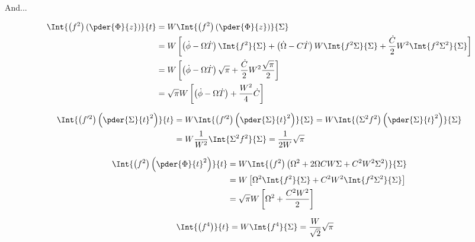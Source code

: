 And...

\begin{equation}
\begin{split}
\Int{\left(f^2\right)  \left(\pder{\Phi}{z}\right)}{t}  &= W \Int{\left(f^2\right)  \left(\pder{\Phi}{z}\right)}{\Sigma}\\
& = W\left[\left(\dot{\phi}- \Omega\dot{T}\right)\Int{f^2}{\Sigma} + \left(\dot{\Omega}- C\dot{T}\right)W \Int{ f^2 \Sigma}{\Sigma}  + \frac{\dot{C}}{2}W^2 \Int{ f^2 \Sigma^2}{\Sigma} \right]  \\
& = W\left[\left(\dot{\phi}- \Omega\dot{T}\right)\sqrt{\pi} + \frac{\dot{C}}{2}W^2 \frac{\sqrt{\pi}}{2} \right]  \\
& = \sqrt{\pi} W\left[\left(\dot{\phi}- \Omega\dot{T}\right) + \frac{W^2}{4}\dot{C}\right]  \\
\end{split}
\end{equation}

\begin{equation}
\begin{split}
\Int{\left(f'^2\right) \left(\pder{\Sigma}{t}^2\right)}{t} & = W\Int{\left(f'^2\right) \left(\pder{\Sigma}{t}^2\right) }{\Sigma} =W\Int{\left(\Sigma^2f^2\right) \left(\pder{\Sigma}{t}^2\right) }{\Sigma}  \\
& = W\frac{1}{W^2}\Int{\Sigma^2 f^2}{\Sigma}  = \frac{1}{2W}\sqrt{\pi}\\
\end{split}
\end{equation}

\begin{equation}
\begin{split}
\Int{ \left(f^2\right)  \left(\pder{\Phi}{t}^2\right)}{t} & = W\Int{ \left(f^2\right)  \left(\Omega^2 + 2\Omega C W \Sigma + C^2 W^2 \Sigma^2\right) }{\Sigma} \\
& = W\left[ \Omega^2 \Int{f^2}{\Sigma} + C^2 W^2 \Int{f^2\Sigma^2 }{\Sigma} \right]\\
& = \sqrt{\pi} W \left[ \Omega^2 + \frac{C^2 W^2}{2}\right]
\end{split}
\end{equation}

\begin{equation}
\begin{split}
\Int{ \left(f^4\right)}{t} & = W\Int{f^4 }{\Sigma} = \frac{W}{\sqrt{2}} \sqrt{\pi}
\end{split}
\end{equation}

